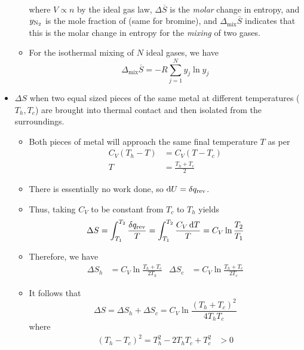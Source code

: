 \documentclass[../notes.tex]{subfiles}
\begin{document}
\begin{itemize}
\begin{itemize}
\begin{align*}
        \end{align*}
        where $V\propto n$ by the ideal gas law, $\Delta\overline{S}$ is the \emph{molar} change in entropy, and $y_{\ce{N2}}$ is the mole fraction of  (same for bromine), and $\Delta_\text{mix}\overline{S}$ indicates that this is the molar change in entropy for the \emph{mixing} of two gases.
        \item For the isothermal mixing of $N$ ideal gases, we have
        \begin{equation*}
            \Delta_\text{mix}\overline{S} = -R\sum_{j=1}^Ny_j\ln y_j
        \end{equation*}
    \end{itemize}
    \item $\Delta S$ when two equal sized pieces of the same metal at different temperatures ($T_h,T_c$) are brought into thermal contact and then isolated from the surroundings.
    \begin{itemize}
        \item Both pieces of metal will approach the same final temperature $T$ as per
        \begin{align*}
            C_V(T_h-T) &= C_V(T-T_c)\\
            T &= \frac{T_h+T_c}{2}
        \end{align*}
        \item There is essentially no work done, so $\dd{U}=\var{q_\text{rev}}$.
        \item Thus, taking $C_V$ to be constant from $T_c$ to $T_h$ yields
        \begin{equation*}
            \Delta S = \int_{T_1}^{T_2}\frac{\var{q_\text{rev}}}{T}
            = \int_{T_1}^{T_2}\frac{C_V\dd{T}}{T}
            = C_V\ln\frac{T_2}{T_1}
        \end{equation*}
        \item Therefore, we have
        \begin{align*}
            \Delta S_h &= C_V\ln\frac{T_h+T_c}{2T_h}&
            \Delta S_c &= C_V\ln\frac{T_h+T_c}{2T_c}
        \end{align*}
        \item It follows that
        \begin{equation*}
            \Delta S = \Delta S_h+\Delta S_c
            = C_V\ln\frac{(T_h+T_c)^2}{4T_hT_c}
        \end{equation*}
        where
        \begin{align*}
            (T_h-T_c)^2 = T_h^2-2T_hT_c+T_c^2 &> 0\\

\end{align*}
\end{itemize}
\end{itemize}
\end{document}
